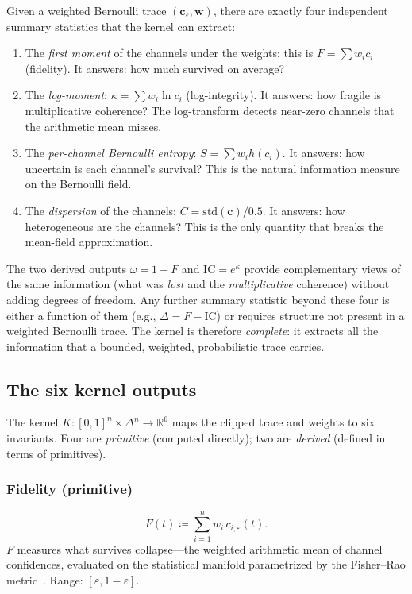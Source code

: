 \documentclass[
  aps,
  prd,
  twocolumn,
  superscriptaddress,
  nofootinbib,
  floatfix
]{revtex4-2}
\newcommand{\eps}{\varepsilon}
\newcommand{\beq}{\begin{equation}}
\newcommand{\eeq}{\end{equation}}
\newcommand{\tvec}{\mathbf{c}}
\newcommand{\wvec}{\mathbf{w}}
\newcommand{\IC}{\mathrm{IC}}
\begin{document}
Given a weighted Bernoulli trace $(\tvec_\eps, \wvec)$, there are
exactly four independent summary statistics that the kernel can
extract:
\begin{enumerate}[leftmargin=*,label=(\arabic*)]
\item The \emph{first moment} of the channels under the weights:
  this is $F = \sum w_i c_i$ (fidelity).  It answers: how much
  survived on average?
\item The \emph{log-moment}: $\kappa = \sum w_i \ln c_i$
  (log-integrity).  It answers: how fragile is multiplicative
  coherence?  The log-transform detects near-zero channels that
  the arithmetic mean misses.
\item The \emph{per-channel Bernoulli entropy}:
  $S = \sum w_i h(c_i)$.  It answers: how uncertain is each
  channel's survival?  This is the natural information measure on
  the Bernoulli field.
\item The \emph{dispersion} of the channels:
  $C = \mathrm{std}(\tvec)/0.5$.  It answers: how heterogeneous
  are the channels?  This is the only quantity that breaks the
  mean-field approximation.
\end{enumerate}
The two derived outputs $\omega = 1 - F$ and
$\IC = e^\kappa$ provide complementary views of the same
information (what was \emph{lost} and the \emph{multiplicative}
coherence) without adding degrees of freedom.  Any further
summary statistic beyond these four is either a function of them
(e.g., $\Delta = F - \IC$) or requires structure not present in
a weighted Bernoulli trace.  The kernel is therefore
\emph{complete}: it extracts all the information that a bounded,
weighted, probabilistic trace carries.

\subsection{The six kernel outputs}

The kernel $K: [0,1]^n \times \Delta^n \to \mathbb{R}^6$ maps the
clipped trace and weights to six invariants.  Four are
\emph{primitive} (computed directly); two are \emph{derived}
(defined in terms of primitives).

\subsubsection{Fidelity (primitive)}
\beq
  F(t) \coloneqq \sum_{i=1}^n w_i \, c_{i,\eps}(t).
  \label{eq:F}
\eeq
$F$ measures what survives collapse---the weighted arithmetic mean
of channel confidences, evaluated on the statistical manifold
parametrized by the Fisher--Rao
metric~\cite{fisher1925,rao1945information,amari2016information}.
Range: $[\eps, 1-\eps]$.
\end{document}
